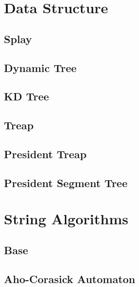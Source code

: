 \documentclass[10pt]{article}
\begin{document}
\tableofcontents
\newpage

\section{Data Structure}
\subsection{Splay}

\subsection{Dynamic Tree}

\subsection{KD Tree}

\subsection{Treap}

\subsection{President Treap}

\subsection{President Segment Tree}


\section{String Algorithms}
\subsection{Base}



\subsection{Aho-Corasick Automaton}

\end{document}
